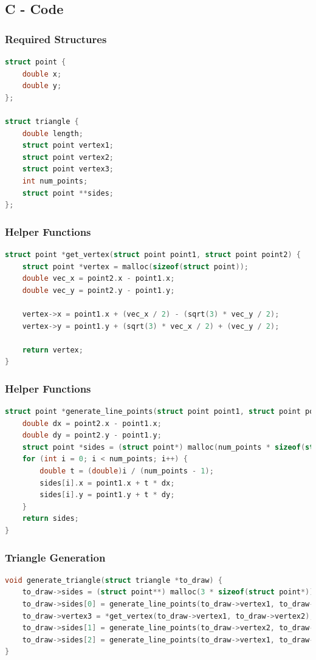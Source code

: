 \documentclass{beamer}
\theoremstyle{remark}
\numberwithin{equation}{section}
\begin{document}
\subsection{C - Code}
\begin{frame}[fragile]
\frametitle{Required Structures}
\begin{lstlisting}[language=C, caption=C example]
struct point {
    double x;
    double y;
};

struct triangle {
    double length;
    struct point vertex1;
    struct point vertex2;
    struct point vertex3;
    int num_points;
    struct point **sides;
};
\end{lstlisting}
\end{frame}
\begin{frame}[fragile]
\frametitle{Helper Functions}
\begin{lstlisting}[language=C, caption=C example]
struct point *get_vertex(struct point point1, struct point point2) {
    struct point *vertex = malloc(sizeof(struct point));
    double vec_x = point2.x - point1.x;
    double vec_y = point2.y - point1.y;
    
    vertex->x = point1.x + (vec_x / 2) - (sqrt(3) * vec_y / 2);
    vertex->y = point1.y + (sqrt(3) * vec_x / 2) + (vec_y / 2);
    
    return vertex;
}
\end{lstlisting}
\end{frame}
\begin{frame}[fragile]
\frametitle{Helper Functions}
\begin{lstlisting}[language=C, caption=C example]
struct point *generate_line_points(struct point point1, struct point point2, int num_points) {
    double dx = point2.x - point1.x;
    double dy = point2.y - point1.y;
    struct point *sides = (struct point*) malloc(num_points * sizeof(struct point));
    for (int i = 0; i < num_points; i++) {
        double t = (double)i / (num_points - 1);
        sides[i].x = point1.x + t * dx;
        sides[i].y = point1.y + t * dy;
    }
    return sides;
}
\end{lstlisting}
\end{frame}
\begin{frame}[fragile]
\frametitle{Triangle Generation}
\begin{lstlisting}[language=C, caption=C example]
void generate_triangle(struct triangle *to_draw) {
    to_draw->sides = (struct point**) malloc(3 * sizeof(struct point*));
    to_draw->sides[0] = generate_line_points(to_draw->vertex1, to_draw->vertex2, to_draw->num_points);
    to_draw->vertex3 = *get_vertex(to_draw->vertex1, to_draw->vertex2);
    to_draw->sides[1] = generate_line_points(to_draw->vertex2, to_draw->vertex3, to_draw->num_points);
    to_draw->sides[2] = generate_line_points(to_draw->vertex1, to_draw->vertex3, to_draw->num_points);
}
\end{lstlisting}
\end{frame}
\end{document}

